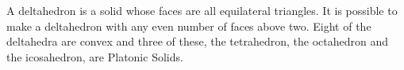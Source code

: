 A deltahedron is a solid whose faces are all equilateral triangles. 
It is possible to make a deltahedron with any even number of faces above two. 
Eight of the deltahedra are convex and three of these, the tetrahedron, the octahedron 
and the icosahedron, are Platonic Solids.